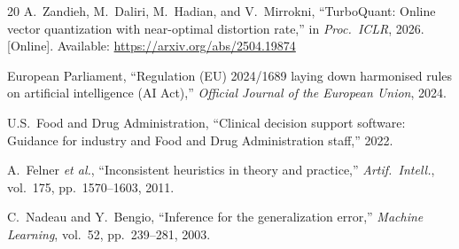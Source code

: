 \documentclass[journal]{IEEEtran}
\begin{document}
\begin{thebibliography}{20}
A.~Zandieh, M.~Daliri, M.~Hadian, and V.~Mirrokni,
``TurboQuant: Online vector quantization with near-optimal
distortion rate,'' in \emph{Proc.\ ICLR}, 2026.
[Online]. Available: \url{https://arxiv.org/abs/2504.19874}

European Parliament, ``Regulation (EU) 2024/1689 laying down
harmonised rules on artificial intelligence (AI Act),''
\emph{Official Journal of the European Union}, 2024.

U.S.\ Food and Drug Administration, ``Clinical decision support
software: Guidance for industry and Food and Drug Administration
staff,'' 2022.

A.~Felner \emph{et al.}, ``Inconsistent heuristics in theory and
practice,'' \emph{Artif.\ Intell.}, vol.~175, pp.~1570--1603, 2011.

C.~Nadeau and Y.~Bengio, ``Inference for the generalization error,''
\emph{Machine Learning}, vol.~52, pp.~239--281, 2003.

\end{thebibliography}
\end{document}
